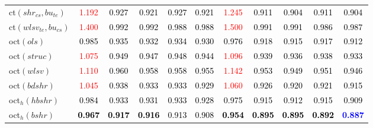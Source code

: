 \begin{tabular}[t]{l|>{}cccc>{}c|ccccc}
ct$(shr_{cs}, bu_{te})$ & \textcolor{red}{1.192} & \textcolor{black}{0.927} & \textcolor{black}{0.921} & \textcolor{black}{0.927} & \textcolor{black}{0.921} & \textcolor{red}{1.245} & \textcolor{black}{0.911} & \textcolor{black}{0.904} & \textcolor{black}{0.911} & \textcolor{black}{0.904}\\
ct$(wlsv_{te}, bu_{cs})$ & \textcolor{red}{1.400} & \textcolor{black}{0.992} & \textcolor{black}{0.992} & \textcolor{black}{0.988} & \textcolor{black}{0.988} & \textcolor{red}{1.500} & \textcolor{black}{0.991} & \textcolor{black}{0.991} & \textcolor{black}{0.986} & \textcolor{black}{0.987}\\
oct$(ols)$ & \textcolor{black}{0.985} & \textcolor{black}{0.935} & \textcolor{black}{0.932} & \textcolor{black}{0.934} & \textcolor{black}{0.930} & \textcolor{black}{0.976} & \textcolor{black}{0.918} & \textcolor{black}{0.915} & \textcolor{black}{0.917} & \textcolor{black}{0.912}\\
oct$(struc)$ & \textcolor{red}{1.075} & \textcolor{black}{0.949} & \textcolor{black}{0.947} & \textcolor{black}{0.948} & \textcolor{black}{0.944} & \textcolor{red}{1.096} & \textcolor{black}{0.939} & \textcolor{black}{0.936} & \textcolor{black}{0.938} & \textcolor{black}{0.933}\\
oct$(wlsv)$ & \textcolor{red}{1.110} & \textcolor{black}{0.960} & \textcolor{black}{0.958} & \textcolor{black}{0.958} & \textcolor{black}{0.955} & \textcolor{red}{1.142} & \textcolor{black}{0.953} & \textcolor{black}{0.949} & \textcolor{black}{0.951} & \textcolor{black}{0.946}\\
oct$(bdshr)$ & \textcolor{red}{1.045} & \textcolor{black}{0.938} & \textcolor{black}{0.933} & \textcolor{black}{0.933} & \textcolor{black}{0.929} & \textcolor{red}{1.060} & \textcolor{black}{0.926} & \textcolor{black}{0.920} & \textcolor{black}{0.921} & \textcolor{black}{0.915}\\
oct$_h(hbshr)$ & \textcolor{black}{0.984} & \textcolor{black}{0.933} & \textcolor{black}{0.931} & \textcolor{black}{0.933} & \textcolor{black}{0.928} & \textcolor{black}{0.975} & \textcolor{black}{0.915} & \textcolor{black}{0.912} & \textcolor{black}{0.915} & \textcolor{black}{0.909}\\
oct$_h(bshr)$ & \textcolor{black}{\textbf{0.967}} & \textcolor{black}{\textbf{0.917}} & \textcolor{black}{\textbf{0.916}} & \textcolor{black}{0.913} & \textcolor{black}{0.908} & \textcolor{black}{\textbf{0.954}} & \textcolor{black}{\textbf{0.895}} & \textcolor{black}{\textbf{0.895}} & \textcolor{black}{\textbf{0.892}} & \textcolor{blue}{\textbf{0.887}}\\

\end{tabular}

